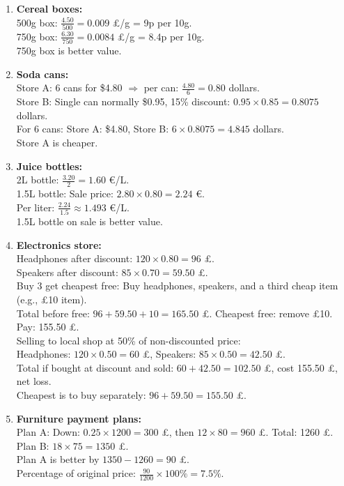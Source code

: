\documentclass[12pt]{article}
\begin{document}
\begin{enumerate}[resume]
    \item \textbf{Cereal boxes:} \\
    500g box: \( \frac{4.50}{500} = 0.009\) £/g = 9p per 10g. \\
    750g box: \( \frac{6.30}{750} = 0.0084\) £/g = 8.4p per 10g. \\
    750g box is better value.

    \item \textbf{Soda cans:} \\
    Store A: 6 cans for \$4.80 \(\Rightarrow\) per can: \( \frac{4.80}{6} = 0.80\) dollars. \\
    Store B: Single can normally \$0.95, 15\% discount: \( 0.95 \times 0.85 = 0.8075\) dollars. \\
    For 6 cans: Store A: \$4.80, Store B: \( 6 \times 0.8075 = 4.845\) dollars. \\
    Store A is cheaper.

    \item \textbf{Juice bottles:} \\
    2L bottle: \( \frac{3.20}{2} = 1.60\) €/L. \\
    1.5L bottle: Sale price: \( 2.80 \times 0.80 = 2.24\) €. \\
    Per liter: \( \frac{2.24}{1.5} \approx 1.493\) €/L. \\
    1.5L bottle on sale is better value.

    \item \textbf{Electronics store:} \\
    Headphones after discount: \( 120 \times 0.80 = 96\) £. \\
    Speakers after discount: \( 85 \times 0.70 = 59.50\) £. \\
    Buy 3 get cheapest free: Buy headphones, speakers, and a third cheap item (e.g., £10 item). \\
    Total before free: \( 96 + 59.50 + 10 = 165.50\) £. Cheapest free: remove £10. \\
    Pay: 155.50 £. \\
    Selling to local shop at 50\% of non-discounted price: \\
    Headphones: \( 120 \times 0.50 = 60\) £, Speakers: \( 85 \times 0.50 = 42.50\) £. \\
    Total if bought at discount and sold: \( 60 + 42.50 = 102.50\) £, cost 155.50 £, net loss. \\
    Cheapest is to buy separately: \( 96 + 59.50 = 155.50\) £.

    \item \textbf{Furniture payment plans:} \\
    Plan A: Down: \( 0.25 \times 1200 = 300\) £, then \( 12 \times 80 = 960\) £. Total: 1260 £. \\
    Plan B: \( 18 \times 75 = 1350\) £. \\
    Plan A is better by \( 1350 - 1260 = 90\) £. \\
    Percentage of original price: \( \frac{90}{1200} \times 100\% = 7.5\%\).
\end{enumerate}
\end{document}
